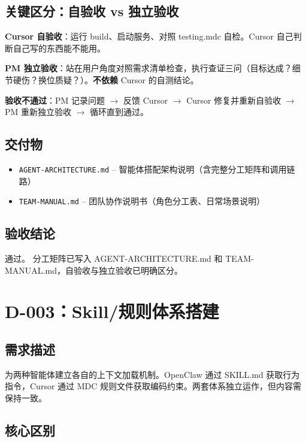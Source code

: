 \documentclass[11pt,a4paper]{article}
\begin{document}
\subsection{关键区分：自验收 vs 独立验收}

\textbf{Cursor 自验收}：运行 build、启动服务、对照 testing.mdc 自检。Cursor 自己判断自己写的东西能不能用。

\textbf{PM 独立验收}：站在用户角度对照需求清单检查，执行查证三问（目标达成？细节硬伤？换位质疑？）。\textbf{不依赖} Cursor 的自测结论。

\textbf{验收不通过}：PM 记录问题 $\to$ 反馈 Cursor $\to$ Cursor 修复并重新自验收 $\to$ PM 重新独立验收 $\to$ 循环直到通过。

\subsection{交付物}

\begin{itemize}[nosep]
  \item \texttt{AGENT-ARCHITECTURE.md} -- 智能体搭配架构说明（含完整分工矩阵和调用链路）
  \item \texttt{TEAM-MANUAL.md} -- 团队协作说明书（角色分工表、日常场景说明）
\end{itemize}

\subsection{验收结论}

\textcolor{success}{通过。} 分工矩阵已写入 AGENT-ARCHITECTURE.md 和 TEAM-MANUAL.md，自验收与独立验收已明确区分。

\section{D-003：Skill/规则体系搭建}

\subsection{需求描述}

为两种智能体建立各自的上下文加载机制。OpenClaw 通过 SKILL.md 获取行为指令，Cursor 通过 MDC 规则文件获取编码约束。两套体系独立运作，但内容需保持一致。

\subsection{核心区别}
\end{document}
